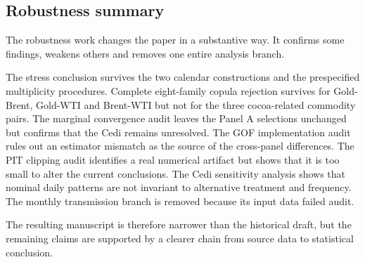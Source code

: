 \subsection{Robustness summary}

The robustness work changes the paper in a substantive way. It confirms some findings, weakens others and removes one entire analysis branch.

The stress conclusion survives the two calendar constructions and the prespecified multiplicity procedures. Complete eight-family copula rejection survives for Gold-Brent, Gold-WTI and Brent-WTI but not for the three cocoa-related commodity pairs. The marginal convergence audit leaves the Panel A selections unchanged but confirms that the Cedi remains unresolved. The GOF implementation audit rules out an estimator mismatch as the source of the cross-panel differences. The PIT clipping audit identifies a real numerical artifact but shows that it is too small to alter the current conclusions. The Cedi sensitivity analysis shows that nominal daily patterns are not invariant to alternative treatment and frequency. The monthly transmission branch is removed because its input data failed audit.

The resulting manuscript is therefore narrower than the historical draft, but the remaining claims are supported by a clearer chain from source data to statistical conclusion.
